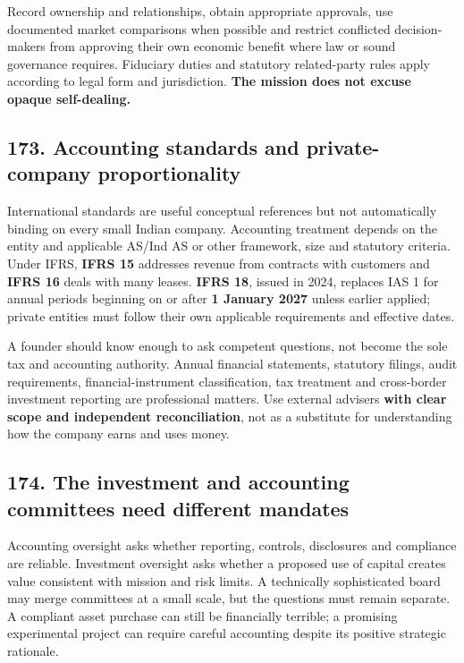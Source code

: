 Record ownership and relationships, obtain appropriate approvals, use documented market comparisons when possible and restrict conflicted decision-makers from approving their own economic benefit where law or sound governance requires. Fiduciary duties and statutory related-party rules apply according to legal form and jurisdiction. \textbf{The mission does not excuse opaque self-dealing.}

\subsection{173. Accounting standards and private-company proportionality}


International standards are useful conceptual references but not automatically binding on every small Indian company. Accounting treatment depends on the entity and applicable AS/Ind AS or other framework, size and statutory criteria. Under IFRS, \textbf{IFRS 15} addresses revenue from contracts with customers and \textbf{IFRS 16} deals with many leases. \textbf{IFRS 18}, issued in 2024, replaces IAS 1 for annual periods beginning on or after \textbf{1 January 2027} unless earlier applied; private entities must follow their own applicable requirements and effective dates.

A founder should know enough to ask competent questions, not become the sole tax and accounting authority. Annual financial statements, statutory filings, audit requirements, financial-instrument classification, tax treatment and cross-border investment reporting are professional matters. Use external advisers \textbf{with clear scope and independent reconciliation}, not as a substitute for understanding how the company earns and uses money.

\subsection{174. The investment and accounting committees need different mandates}


Accounting oversight asks whether reporting, controls, disclosures and compliance are reliable. Investment oversight asks whether a proposed use of capital creates value consistent with mission and risk limits. A technically sophisticated board may merge committees at a small scale, but the questions must remain separate. A compliant asset purchase can still be financially terrible; a promising experimental project can require careful accounting despite its positive strategic rationale.

